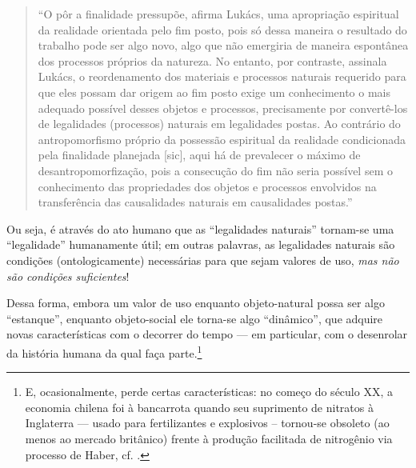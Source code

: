 \documentclass[12pt]{article}
\begin{document}
\begin{quote}
    ``O pôr a finalidade pressupõe, afirma Lukács, uma apropriação espiritual da realidade orientada pelo fim posto, pois só dessa maneira o resultado do trabalho pode ser algo novo, algo que não emergiria de maneira espontânea dos processos próprios da natureza. No entanto, por contraste, assinala Lukács, o reordenamento dos materiais e processos naturais requerido para que eles possam dar origem ao fim posto exige um conhecimento o mais adequado possível desses objetos e processos, precisamente por convertê-los de legalidades (processos) naturais em legalidades postas. Ao contrário do antropomorfismo próprio da possessão espiritual da realidade condicionada pela finalidade planejada [sic], aqui há de prevalecer o máximo de desantropomorfização, pois a consecução do fim não seria possível sem o conhecimento das propriedades dos objetos e processos envolvidos na transferência das causalidades naturais em causalidades postas.'' \cite[p. 127]{Duayer2023a}
\end{quote}

Ou seja, é através do ato humano que as ``legalidades naturais'' tornam-se uma ``legalidade'' humanamente útil; em outras palavras, as legalidades naturais são condições (ontologicamente) necessárias para que sejam valores de uso, \textit{mas não são condições suficientes}!

Dessa forma, embora um valor de uso enquanto objeto-natural possa ser algo ``estanque'', enquanto objeto-social ele torna-se algo ``dinâmico'', que adquire novas características com o decorrer do tempo --- em particular, com o desenrolar da história humana da qual faça parte.\footnote{E, ocasionalmente, perde certas características: no começo do século XX, a economia chilena foi à bancarrota quando seu suprimento de nitratos à Inglaterra --- usado para fertilizantes e explosivos -- tornou-se obsoleto (ao menos ao mercado britânico) frente à produção facilitada de nitrogênio via processo de Haber, cf. \cite{Foster2004}.}

  
\end{document}
